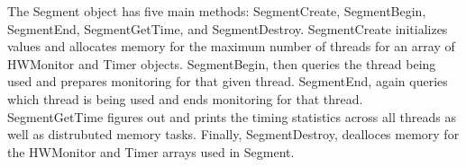 %


The Segment object has five main methods: SegmentCreate, SegmentBegin, SegmentEnd,
SegmentGetTime, and SegmentDestroy. SegmentCreate initializes values and
allocates memory for the maximum number of threads for an array of HWMonitor and Timer
objects. SegmentBegin, then queries the thread being used and prepares
monitoring for that given thread. SegmentEnd, again queries which thread is
being used and ends monitoring for that thread. SegmentGetTime figures out and
prints the timing statistics across all threads as well as distrubuted memory
tasks. Finally, SegmentDestroy, dealloces memory for the HWMonitor and
Timer arrays used in Segment.


